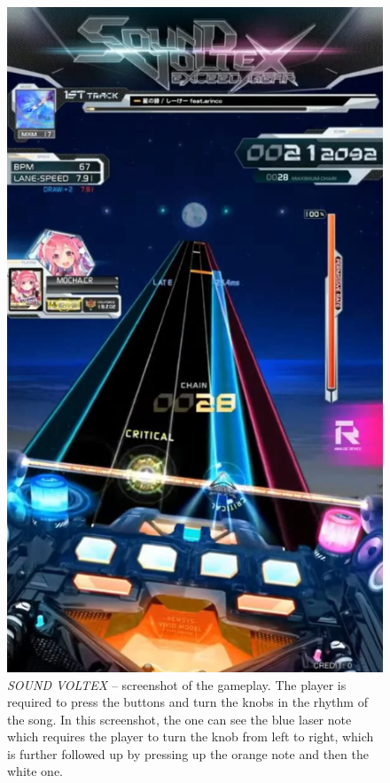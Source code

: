 \begin{figure}[h]
    \centering\includegraphics[scale=0.4]{obrazki/sdvx.png}
    \caption{\textit{SOUND VOLTEX} -- screenshot of the gameplay. The player is required to press the buttons and turn the knobs in the rhythm of the song. In this screenshot, the one can see the blue laser note which requires the player to turn the knob from left to right, which is further followed up by pressing up the orange note and then the white one. \cite{sdvx}}
    \label{fig:sdvx2}
\end{figure}

